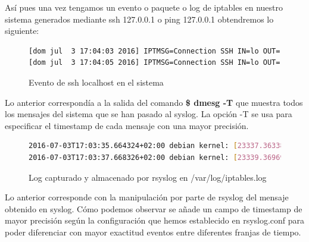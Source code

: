 Así pues una vez tengamos un evento o paquete o log de iptables en nuestro sistema generados mediante ssh 127.0.0.1 o ping 127.0.0.1 obtendremos lo siguiente:

\begin{figure}[H]
\begin{lstlisting}[language=bash, breaklines=true]
[dom jul  3 17:04:03 2016] IPTMSG=Connection SSH IN=lo OUT= MAC=00:00:00:00:00:00:00:00:00:00:00:00:08:00 SRC=127.0.0.1 DST=127.0.0.1 LEN=60 TOS=0x00 PREC=0x00 TTL=64 ID=39454 DF PROTO=TCP SPT=47706 DPT=22 WINDOW=43690 RES=0x00 SYN URGP=0
[dom jul  3 17:04:05 2016] IPTMSG=Connection SSH IN=lo OUT= MAC=00:00:00:00:00:00:00:00:00:00:00:00:08:00 SRC=127.0.0.1 DST=127.0.0.1 LEN=60 TOS=0x00 PREC=0x00 TTL=64 ID=39455 DF PROTO=TCP SPT=47706 DPT=22 WINDOW=43690 RES=0x00 SYN URGP=0
\end{lstlisting}
\caption{Evento de ssh localhost en el sistema}
\end{figure}

Lo anterior correspondía a la salida del comando \textbf{\$ dmesg -T} que muestra todos los mensajes del sistema que se han pasado al syslog. La opción -T se usa para especificar el timestamp de cada mensaje con una mayor precisión.\\

\begin{figure}[H]
\begin{lstlisting}[language=bash, breaklines=true]
2016-07-03T17:03:35.664324+02:00 debian kernel: [23337.363387] IPTMSG=Connection SSH IN=lo OUT= MAC=00:00:00:00:00:00:00:00:00:00:00:00:08:00 SRC=127.0.0.1 DST=127.0.0.1 LEN=60 TOS=0x00 PREC=0x00 TTL=64 ID=39454 DF PROTO=TCP SPT=47706 DPT=22 WINDOW=43690 RES=0x00 SYN URGP=0
2016-07-03T17:03:37.668326+02:00 debian kernel: [23339.369692] IPTMSG=Connection SSH IN=lo OUT= MAC=00:00:00:00:00:00:00:00:00:00:00:00:08:00 SRC=127.0.0.1 DST=127.0.0.1 LEN=60 TOS=0x00 PREC=0x00 TTL=64 ID=39455 DF PROTO=TCP SPT=47706 DPT=22 WINDOW=43690 RES=0x00 SYN URGP=0
\end{lstlisting}
\caption{Log capturado y almacenado por rsyslog en /var/log/iptables.log}
\end{figure}

Lo anterior corresponde con la manipulación por parte de rsyslog del mensaje obtenido en syslog. Cómo podemos observar se añade un campo de timestamp de mayor precisión según la configuración que hemos establecido en rsyslog.conf para poder diferenciar con mayor exactitud eventos entre diferentes franjas de tiempo. \\

